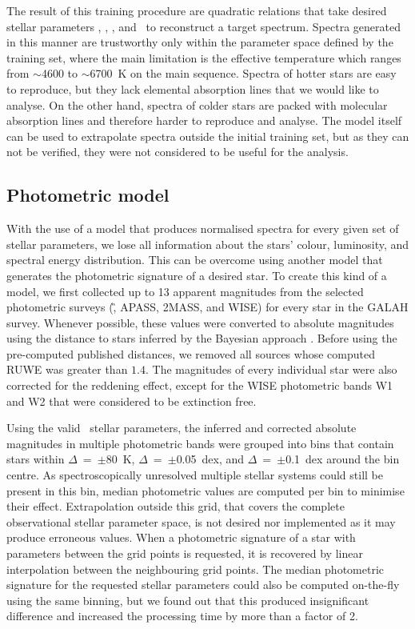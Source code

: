 The result of this training procedure are quadratic relations that take desired stellar parameters \Teff, \Logg, \Feh, and \vsin\ to reconstruct a target spectrum. Spectra generated in this manner are trustworthy only within the parameter space defined by the training set, where the main limitation is the effective temperature which ranges from $\sim$4600 to $\sim$6700~K on the main sequence. Spectra of hotter stars are easy to reproduce, but they lack elemental absorption lines that we would like to analyse. On the other hand, spectra of colder stars are packed with molecular absorption lines and therefore harder to reproduce and analyse. The model itself can be used to extrapolate spectra outside the initial training set, but as they can not be verified, they were not considered to be useful for the analysis.

\subsection{Photometric model}
\label{sec:p_model}
With the use of a model that produces normalised spectra for every given set of stellar parameters, we lose all information about the stars' colour, luminosity, and spectral energy distribution. This can be overcome using another model that generates the photometric signature of a desired star. To create this kind of a model, we first collected up to 13 apparent magnitudes from the selected photometric surveys (\G, APASS, 2MASS, and WISE) for every star in the GALAH survey. Whenever possible, these values were converted to absolute magnitudes using the distance to stars inferred by the Bayesian approach \citep{2018AJ....156...58B}. Before using the pre-computed published distances, we removed all sources whose computed RUWE was greater than $1.4$. The magnitudes of every individual star were also corrected for the reddening effect, except for the WISE photometric bands W1 and W2 that were considered to be extinction free.

Using the valid \TC\ stellar parameters, the inferred and corrected absolute magnitudes in multiple photometric bands were grouped into bins that contain stars within $\Delta$\Teff~=~$\pm$80~K, $\Delta$\Logg~=~$\pm$0.05~dex, and $\Delta$\Feh~=~$\pm$0.1~dex around the bin centre. As spectroscopically unresolved multiple stellar systems could still be present in this bin, median photometric values are computed per bin to minimise their effect. Extrapolation outside this grid, that covers the complete observational stellar parameter space, is not desired nor implemented as it may produce erroneous values. When a photometric signature of a star with parameters between the grid points is requested, it is recovered by linear interpolation between the neighbouring grid points. The median photometric signature for the requested stellar parameters could also be computed on-the-fly using the same binning, but we found out that this produced insignificant difference and increased the processing time by more than a factor of 2.

